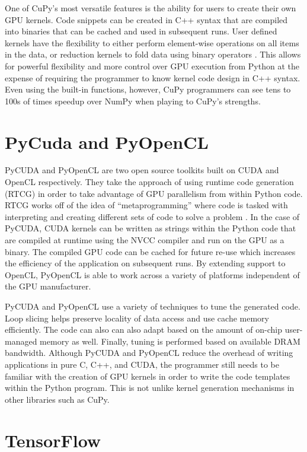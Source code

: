 \quad One of CuPy's most versatile features is the ability for users to create their own GPU kernels. Code snippets can be created in C++ syntax that are compiled into binaries that can be cached and used in subsequent runs. User defined kernels have the flexibility to either perform element-wise operations on all items in the data, or reduction kernels to fold data using binary operators \cite{cupy}. This allows for powerful flexibility and more control over GPU execution from Python at the expense of requiring the programmer to know kernel code design in C++ syntax. Even using the built-in functions, however, CuPy programmers can see tens to 100s of times speedup over NumPy when playing to CuPy's strengths.

\section{PyCuda and PyOpenCL}

PyCUDA and PyOpenCL are two open source toolkits built on CUDA and OpenCL respectively. They take the approach of using runtime code generation (RTCG) in order to take advantage of GPU parallelism from within Python code. RTCG works off of the idea of ``metaprogramming'' where code is tasked with interpreting and creating different sets of code to solve a problem \cite{pycuda}. In the case of PyCUDA, CUDA kernels can be written as strings within the Python code that are compiled at runtime using the NVCC compiler and run on the GPU as a binary. The compiled GPU code can be cached for future re-use which increases the efficiency of the application on subsequent runs. By extending support to OpenCL, PyOpenCL is able to work across a variety of platforms independent of the GPU manufacturer. 

\quad PyCUDA and PyOpenCL use a variety of techniques to tune the generated code. Loop slicing helps preserve locality of data access and use cache memory efficiently. The code can also can also adapt based on the amount of on-chip user-managed memory as well. Finally, tuning is performed based on available DRAM bandwidth. Although PyCUDA and PyOpenCL reduce the overhead of writing applications in pure C, C++, and CUDA, the programmer still needs to be familiar with the creation of GPU kernels in order to write the code templates within the Python program. This is not unlike kernel generation mechanisms in other libraries such as CuPy.

\section{TensorFlow}

